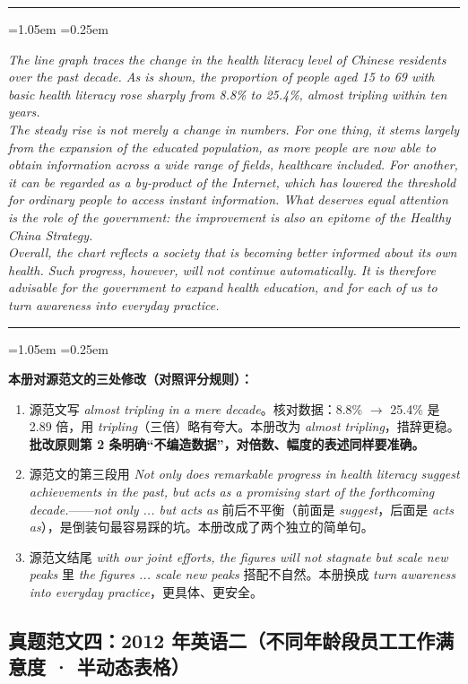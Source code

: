 \documentclass[11pt,a4paper]{ctexart}
\newcommand{\en}[1]{\textit{#1}}
\newenvironment{tpl}[1]{%
  \par\addvspace{7pt}\needspace{4\baselineskip}%
  \noindent{\bfseries\color{accent}#1}\par\nopagebreak
  \vspace{2pt}\noindent\rule{\linewidth}{0.7pt}\par\nopagebreak\vspace{3pt}%
  \begin{list}{}{\leftmargin=1.05em \rightmargin=0.25em \listparindent=0pt
    \itemindent=0pt \topsep=0pt \parsep=2.5pt \itemsep=2.5pt \partopsep=0pt}%
  \item\relax
}{%
  \end{list}\vspace{1pt}\noindent\rule{\linewidth}{0.7pt}\par\addvspace{8pt}%
}
\newenvironment{note}{%
  \par\addvspace{5pt}%
  \begin{list}{}{\leftmargin=1.05em \rightmargin=0.25em \listparindent=0pt
    \itemindent=0pt \topsep=0pt \parsep=2pt \itemsep=2pt \partopsep=0pt}%
  \item\relax\small\color{ink}%
}{%
  \end{list}\addvspace{5pt}%
}
\begin{document}
\begin{tpl}{批注版范文（162 词）}
\en{The line graph traces the change in the health literacy level of Chinese residents over the past decade. As is shown, the proportion of people aged 15 to 69 with basic health literacy rose sharply from 8.8\% to 25.4\%, almost tripling within ten years.}\\[3pt]
\en{The steady rise is not merely a change in numbers. For one thing, it stems largely from the expansion of the educated population, as more people are now able to obtain information across a wide range of fields, healthcare included. For another, it can be regarded as a by-product of the Internet, which has lowered the threshold for ordinary people to access instant information. What deserves equal attention is the role of the government: the improvement is also an epitome of the Healthy China Strategy.}\\[3pt]
\en{Overall, the chart reflects a society that is becoming better informed about its own health. Such progress, however, will not continue automatically. It is therefore advisable for the government to expand health education, and for each of us to turn awareness into everyday practice.}
\end{tpl}

\begin{note}
\textbf{本册对源范文的三处修改（对照评分规则）：}
\begin{enumerate}[leftmargin=1.7em,itemsep=1.5pt,topsep=2pt]
\item 源范文写 \en{almost tripling in a mere decade}。核对数据：8.8\% $\rightarrow$ 25.4\% 是 2.89 倍，用 \en{tripling}（三倍）略有夸大。本册改为 \en{almost tripling}，措辞更稳。\textbf{批改原则第 2 条明确“不编造数据”，对倍数、幅度的表述同样要准确。}
\item 源范文的第三段用 \en{Not only does remarkable progress in health literacy suggest achievements in the past, but acts as a promising start of the forthcoming decade.}——\en{not only ... but acts as} 前后不平衡（前面是 \en{suggest}，后面是 \en{acts as}），是倒装句最容易踩的坑。本册改成了两个独立的简单句。
\item 源范文结尾 \en{with our joint efforts, the figures will not stagnate but scale new peaks} 里 \en{the figures ... scale new peaks} 搭配不自然。本册换成 \en{turn awareness into everyday practice}，更具体、更安全。
\end{enumerate}
\end{note}

\subsection{真题范文四：2012 年英语二（不同年龄段员工工作满意度 · 半动态表格）}
\end{document}
